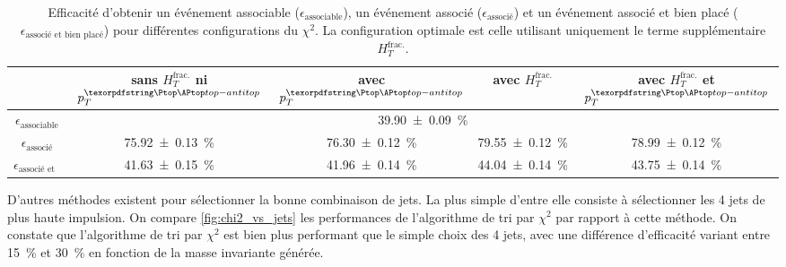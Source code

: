 \begin{table}[h] \centering
    \begin{tabular}{@{}ccccc@{}} \toprule
        & sans $H_{T}^{\text{frac.}}$ ni $p_{T}^{\ttbar}$ & avec $p_{T}^{\ttbar}$ & avec $H_{T}^{\text{frac.}}$ & avec $H_{T}^{\text{frac.}}$ et $p_{T}^{\ttbar}$ \\ \midrule
        $\epsilon_\text{associable}$ & \multicolumn{4}{c}{\SI{39.90 \pm 0.09}{\%}} \\
        $\epsilon_\text{associé}$ & \SI{75.92 \pm 0.13}{\%} & \SI{76.30 \pm 0.12}{\%} & \SI{79.55 \pm 0.12}{\%} & \SI{78.99 \pm 0.12}{\%} \\
        $\epsilon_\text{associé et bien placé}$ & \SI{41.63 \pm 0.15}{\%} & \SI{41.96 \pm 0.14}{\%} & \SI{44.04 \pm 0.14}{\%} & \SI{43.75 \pm 0.14}{\%} \\ \bottomrule
    \end{tabular}
    \caption{Efficacité d'obtenir un événement associable ($\epsilon_\text{associable}$), un événement associé ($\epsilon_\text{associé}$) et un événement associé et bien placé ($\epsilon_\text{associé et bien placé}$) pour différentes configurations du $\chi^2$. La configuration optimale est celle utilisant uniquement le terme supplémentaire $H_{T}^{\text{frac.}}$.}
    \label{tab:chi2_study}
\end{table}

D'autres méthodes existent pour sélectionner la bonne combinaison de jets. La plus simple d'entre elle consiste à sélectionner les 4 jets de plus haute impulsion. On compare \cref{fig:chi2_vs_jets} les performances de l'algorithme de tri par $\chi^2$ par rapport à cette méthode. On constate que l'algorithme de tri par $\chi^2$ est bien plus performant que le simple choix des 4 jets, avec une différence d'efficacité variant entre \tilde\SI{15}{\%} et \tilde\SI{30}{\%} en fonction de la masse invariante \ttbar générée.


